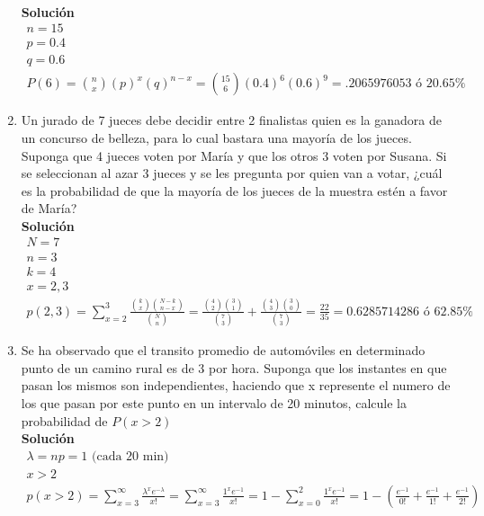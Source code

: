 \begin{enumerate}
    \\\textbf{Solución}
    \\
    \begin{gather*}
    n=15\\
    p=0.4\\
    q=0.6\\
    P(6) = \binom{n}{x}\left(p\right)^{x}\left(q\right)^{n-x}=\binom{15}{6}(0.4)^{6}(0.6)^{9}=.2065976053 \text{ ó } 20.65\%
    \end{gather*}
    \item Un jurado de 7 jueces debe decidir entre 2 finalistas quien es la ganadora de un concurso de belleza, para lo cual bastara una mayoría de los jueces. Suponga que 4 jueces voten por María y que los otros 3 voten por Susana. Si se seleccionan al azar 3 jueces y se les pregunta por quien van a votar, ¿cuál es la probabilidad de que la mayoría de los jueces de la muestra estén a favor de María?
    \\\textbf{Solución}
    \\
    \begin{gather*}
    N=7\\
    n=3\\
    k=4\\
    x=2, 3\\
    p(2, 3) = \sum _{x=2}^{3} \frac{\binom{k}{x}\binom{N-k}{n-x}}{\binom{N}{n}} = \frac{\binom{4}{2}\binom{3}{1}}{\binom{7}{3}} + \frac{\binom{4}{3}\binom{3}{0}}{\binom{7}{3}} = \frac{22}{35} =0.6285714286 \text{ ó } 62.85\%
    \end{gather*}
    \item Se ha observado que el transito promedio de automóviles en determinado punto de un camino rural es de 3 por hora. Suponga que los instantes en que pasan los mismos son independientes, haciendo que x represente el numero de los que pasan por este punto en un intervalo de 20 minutos, calcule la probabilidad de $P(x > 2)$
    \\\textbf{Solución}
    \\
    \begin{gather*}
    \lambda = np = 1 \text{ (cada 20 min)}\\
    x>2\\
    p(x>2) =\sum _{x=3}^{\infty }\frac{{\lambda}^{x}{e}^{-\lambda}}{x!}=\sum _{x=3}^{\infty }\frac{{1}^{x}{e}^{-1}}{x!}=1 - \sum _{x=0}^{2}\frac{{1}^{x}{e}^{-1}}{x!} = 1- \left( \frac{{e}^{-1}}{0!}+\frac{{e}^{-1}}{1!}+\frac{{e}^{-1}}{2!} \right) \\

\end{gather*}
\end{enumerate}
